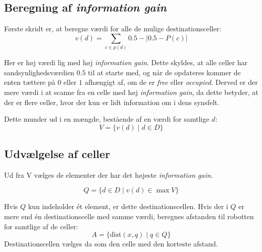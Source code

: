 \subsection{Beregning af \textit{information gain}}
Første skridt er, at beregne værdi for alle de mulige destinationsceller:
\begin{equation}
v(d) = \sum_{c \in p(d)} 0.5-|0.5 - P(c)|
\end{equation}

Her er høj værdi lig med høj \textit{information gain}.
Dette skyldes, at alle celler har sandsynlighedsværdien $0.5$ til at starte med, og når de opdateres kommer de enten tættere på $0$ eller $1$ afhængigt af, om de er \textit{free} eller \textit{occupied}.
Derved er der mere værdi i at scanne fra en celle med høj \textit{information gain}, da dette betyder, at der er flere celler, hvor der kun er lidt information om i dens synsfelt.

Dette munder ud i en mængde, bestående af en værdi for samtlige $d$:
\begin{equation}
V = \{ v(d) \mid d \in D \}
\end{equation}

\subsection{Udvælgelse af celler }
Ud fra V vælges de elementer der har det højeste \textit{information gain}. 


\begin{equation}
Q = \{ d \in D \mid v(d) \in \max V \}
\end{equation}

Hvis $ Q $ kun indeholder ét element, er dette destinationscellen. 
Hvis der i $Q$ er mere end én destinationscelle med samme værdi, beregnes afstanden til robotten for samtlige af de celler:
\begin{equation}
A = \{ \text{dist}(x,q) \mid q \in Q \}
\end{equation}
Destinationscellen vælges da som den celle med den korteste afstand.
